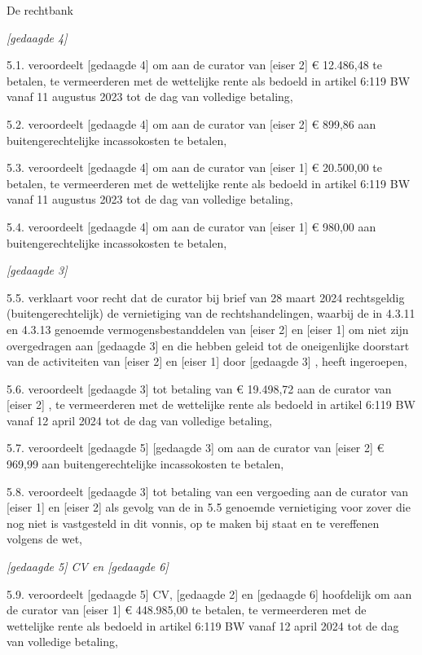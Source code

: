 \documentclass[
  dutch,
  a4paper,
]{article}
\begin{document}
De rechtbank

\emph{{[}gedaagde 4{]}}

5.1. veroordeelt {[}gedaagde 4{]} om aan de curator van {[}eiser 2{]} € 12.486,48 te betalen, te vermeerderen met de wettelijke rente als bedoeld in artikel 6:119 BW vanaf 11 augustus 2023 tot de dag van volledige betaling,

5.2. veroordeelt {[}gedaagde 4{]} om aan de curator van {[}eiser 2{]} € 899,86 aan buitengerechtelijke incassokosten te betalen,

5.3. veroordeelt {[}gedaagde 4{]} om aan de curator van {[}eiser 1{]} € 20.500,00 te betalen, te vermeerderen met de wettelijke rente als bedoeld in artikel 6:119 BW vanaf 11 augustus 2023 tot de dag van volledige betaling,

5.4. veroordeelt {[}gedaagde 4{]} om aan de curator van {[}eiser 1{]} € 980,00 aan buitengerechtelijke incassokosten te betalen,

\emph{{[}gedaagde 3{]}}

5.5. verklaart voor recht dat de curator bij brief van 28 maart 2024 rechtsgeldig (buitengerechtelijk) de vernietiging van de rechtshandelingen, waarbij de in 4.3.11 en 4.3.13 genoemde vermogensbestanddelen van {[}eiser 2{]} en {[}eiser 1{]} om niet zijn overgedragen aan {[}gedaagde 3{]} en die hebben geleid tot de oneigenlijke doorstart van de activiteiten van {[}eiser 2{]} en {[}eiser 1{]} door {[}gedaagde 3{]} , heeft ingeroepen,

5.6. veroordeelt {[}gedaagde 3{]} tot betaling van € 19.498,72 aan de curator van {[}eiser 2{]} , te vermeerderen met de wettelijke rente als bedoeld in artikel 6:119 BW vanaf 12 april 2024 tot de dag van volledige betaling,

5.7. veroordeelt {[}gedaagde 5{]} {[}gedaagde 3{]} om aan de curator van {[}eiser 2{]} € 969,99 aan buitengerechtelijke incassokosten te betalen,

5.8. veroordeelt {[}gedaagde 3{]} tot betaling van een vergoeding aan de curator van {[}eiser 1{]} en {[}eiser 2{]} als gevolg van de in 5.5 genoemde vernietiging voor zover die nog niet is vastgesteld in dit vonnis, op te maken bij staat en te vereffenen volgens de wet,

\emph{{[}gedaagde 5{]} CV en {[}gedaagde 6{]}}

5.9. veroordeelt {[}gedaagde 5{]} CV, {[}gedaagde 2{]} en {[}gedaagde 6{]} hoofdelijk om aan de curator van {[}eiser 1{]} € 448.985,00 te betalen, te vermeerderen met de wettelijke rente als bedoeld in artikel 6:119 BW vanaf 12 april 2024 tot de dag van volledige betaling,
\end{document}
